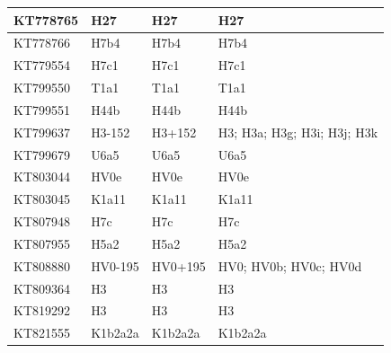 \begin{footnotesize}
\begin{longtable}{|l|l|l|l|}
KT778765          & H27              & H27                  & H27                         \\ \hline
KT778766          & H7b4             & H7b4                 & H7b4                        \\ \hline
KT779554          & H7c1             & H7c1                 & H7c1                        \\ \hline
KT799550          & T1a1             & T1a1                 & T1a1                        \\ \hline
KT799551          & H44b             & H44b                 & H44b                        \\ \hline
KT799637          & H3-152           & H3+152               & H3; H3a; H3g; H3i; H3j; H3k \\ \hline
KT799679          & U6a5             & U6a5                 & U6a5                        \\ \hline
KT803044          & HV0e             & HV0e                 & HV0e                        \\ \hline
KT803045          & K1a11            & K1a11                & K1a11                       \\ \hline
KT807948          & H7c              & H7c                  & H7c                         \\ \hline
KT807955          & H5a2             & H5a2                 & H5a2                        \\ \hline
KT808880          & HV0-195          & HV0+195              & HV0; HV0b; HV0c; HV0d       \\ \hline
KT809364          & H3               & H3                   & H3                          \\ \hline
KT819292          & H3               & H3                   & H3                          \\ \hline
KT821555          & K1b2a2a          & K1b2a2a              & K1b2a2a                     \\ \hline
\end{longtable}
\end{footnotesize}